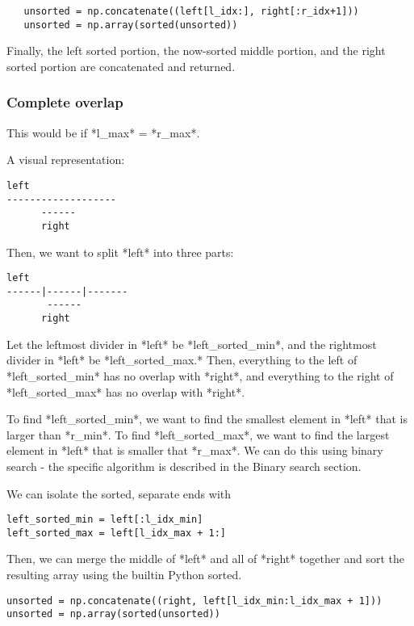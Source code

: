{{{{{{\begin{verbatim}
   unsorted = np.concatenate((left[l_idx:], right[:r_idx+1]))
   unsorted = np.array(sorted(unsorted))
\end{verbatim}

Finally, the left sorted portion, the now-sorted middle portion, and the
right sorted portion are concatenated and returned.

\subsubsection{Complete overlap}

This would be if *l_max* \>= *r_max*.

A visual representation:

\begin{verbatim}
left
-------------------
      ------
      right
\end{verbatim}

Then, we want to split *left* into three parts:

\begin{verbatim}
left
------|------|-------
       ------
      right
\end{verbatim}

Let the leftmost divider in *left* be *left_sorted_min*, and the
rightmost divider in *left* be *left_sorted_max.* Then, everything to
the left of *left_sorted_min* has no overlap with *right*, and
everything to the right of *left_sorted_max* has no overlap with
*right*.

To find *left_sorted_min*, we want to find the smallest element in
*left* that is larger than *r_min*. To find *left_sorted_max*, we want
to find the largest element in *left* that is smaller that *r_max*. We
can do this using binary search - the specific algorithm is described in
the Binary search section.

We can isolate the sorted, separate ends with

\begin{verbatim}
left_sorted_min = left[:l_idx_min]
left_sorted_max = left[l_idx_max + 1:]
\end{verbatim}

Then, we can merge the middle of *left* and all of *right* together and
sort the resulting array using the builtin Python sorted.

\begin{verbatim}
unsorted = np.concatenate((right, left[l_idx_min:l_idx_max + 1]))
unsorted = np.array(sorted(unsorted))
\end{verbatim}

}}}}}}
